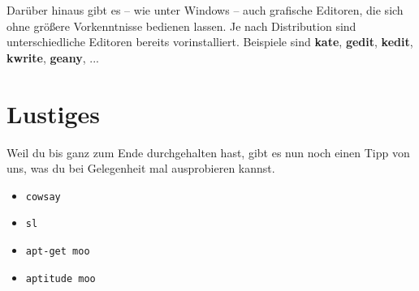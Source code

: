 \documentclass[a4paper,12pt]{article}
\begin{document}
Darüber hinaus gibt es -- wie unter Windows -- auch grafische Editoren, 
die sich ohne größere Vorkenntnisse bedienen lassen. Je nach Distribution
sind unterschiedliche Editoren bereits vorinstalliert. Beispiele sind
\textbf{kate}, \textbf{gedit}, \textbf{kedit}, \textbf{kwrite}, \textbf{geany}, ...


\section{Lustiges}
Weil du bis ganz zum Ende durchgehalten hast, gibt es nun noch einen 
Tipp von uns, was du bei Gelegenheit mal ausprobieren kannst.
\begin{itemize} 
\item \texttt{cowsay}
\item \texttt{sl}
\item \texttt{apt-get moo}
\item \texttt{aptitude moo}
\end{itemize}

\bigskip
{}
\end{document}
